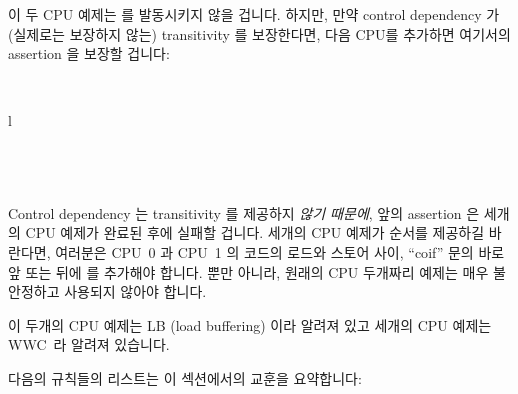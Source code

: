 이 두 CPU 예제는  를 발동시키지 않을 겁니다.
하지만, 만약 control dependency 가 (실제로는 보장하지 않는) transitivity 를
보장한다면, 다음 CPU를 추가하면 여기서의 assertion 을 보장할 겁니다:

\vspace{5pt}
\begin{minipage}[t]{\columnwidth}
\tt
\scriptsize
\begin{tabular}{l}
	 \\
	\hline
	 \\
	 \\
	 \\
\end{tabular}
\end{minipage}
\vspace{5pt}

Control dependency 는 transitivity 를 제공하지 \emph{않기 때문에}, 앞의
assertion 은 세개의 CPU 예제가 완료된 후에 실패할 겁니다.
세개의 CPU 예제가 순서를 제공하길 바란다면, 여러분은 CPU~0 과 CPU~1 의 코드의
로드와 스토어 사이, ``co{if}'' 문의 바로 앞 또는 뒤에  를 추가해야
합니다.
뿐만 아니라, 원래의 CPU 두개짜리 예제는 매우 불안정하고 사용되지 않아야 합니다.

이 두개의 CPU 예제는 LB (load buffering) 이라 알려져 있고 세개의 CPU 예제는
WWC~\cite{Maranget2012TutorialARMPower}라 알려져 있습니다.

다음의 규칙들의 리스트는 이 섹션에서의 교훈을 요약합니다:


